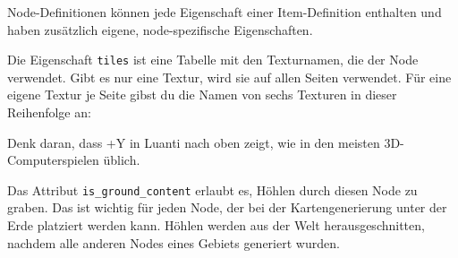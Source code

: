 Node-Definitionen können jede Eigenschaft einer Item-Definition
enthalten und haben zusätzlich eigene, node-spezifische Eigenschaften.

Die Eigenschaft \texttt{tiles} ist eine Tabelle mit den Texturnamen, die
der Node verwendet. Gibt es nur eine Textur, wird sie auf allen Seiten
verwendet. Für eine eigene Textur je Seite gibst du die Namen von sechs
Texturen in dieser Reihenfolge an:

\begin{Shaded}
\begin{Highlighting}[]
\end{Highlighting}
\end{Shaded}

Denk daran, dass +Y in Luanti nach oben zeigt, wie in den meisten
3D-Computerspielen üblich.

\begin{Shaded}
\begin{Highlighting}[]
\OperatorTok{(}\OperatorTok{,} \OperatorTok{\{}
     \OperatorTok{=} \OperatorTok{,}
     \OperatorTok{=} \OperatorTok{\{}
        \OperatorTok{,} 
        \OperatorTok{,} 
        \OperatorTok{,} 
        \OperatorTok{,} 
        \OperatorTok{,} 
        \OperatorTok{,} 
    \OperatorTok{\},}
     \OperatorTok{=} \OperatorTok{,}
     \OperatorTok{=} \OperatorTok{\{}  \OperatorTok{=}  \OperatorTok{\},}
     \OperatorTok{=} \OperatorTok{,}
\OperatorTok{\})}
\end{Highlighting}
\end{Shaded}

Das Attribut \texttt{is\_\allowbreak{}ground\_\allowbreak{}content}
erlaubt es, Höhlen durch diesen Node zu graben. Das ist wichtig für
jeden Node, der bei der
Kartengenerierung unter der
Erde platziert werden kann. Höhlen werden aus der Welt
herausgeschnitten, nachdem alle anderen Nodes eines Gebiets generiert
wurden.

